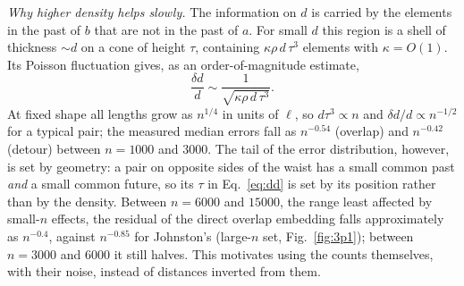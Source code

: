 \documentclass[prd,twocolumn,superscriptaddress,nofootinbib,amsmath,amssymb,floatfix]{revtex4-2}
\begin{document}
\emph{Why higher density helps slowly.} The information on $d$ is carried by the elements in the past of $b$ that are not in the past of $a$. For small $d$ this region is a shell of thickness $\sim d$ on a cone of height $\tau$, containing $\kappa\rho\,d\,\tau^3$ elements with $\kappa=O(1)$. Its Poisson fluctuation gives, as an order-of-magnitude estimate,
\begin{equation}
\frac{\delta d}{d}\sim\frac{1}{\sqrt{\kappa\rho\,d\,\tau^3}}.
\label{eq:dd}
\end{equation}
At fixed shape all lengths grow as $n^{1/4}$ in units of $\ell$, so $d\tau^3\propto n$ and $\delta d/d\propto n^{-1/2}$ for a typical pair; the measured median errors fall as $n^{-0.54}$ (overlap) and $n^{-0.42}$ (detour) between $n=1000$ and $3000$. The tail of the error distribution, however, is set by geometry: a pair on opposite sides of the waist has a small common past \emph{and} a small common future, so its $\tau$ in Eq.~\eqref{eq:dd} is set by its position rather than by the density. Between $n=6000$ and $15000$, the range least affected by small-$n$ effects, the residual of the direct overlap embedding falls approximately as $n^{-0.4}$, against $n^{-0.85}$ for Johnston's (large-$n$ set, Fig.~\ref{fig:3p1}); between $n=3000$ and $6000$ it still halves. This motivates using the counts themselves, with their noise, instead of distances inverted from them.
\end{document}
